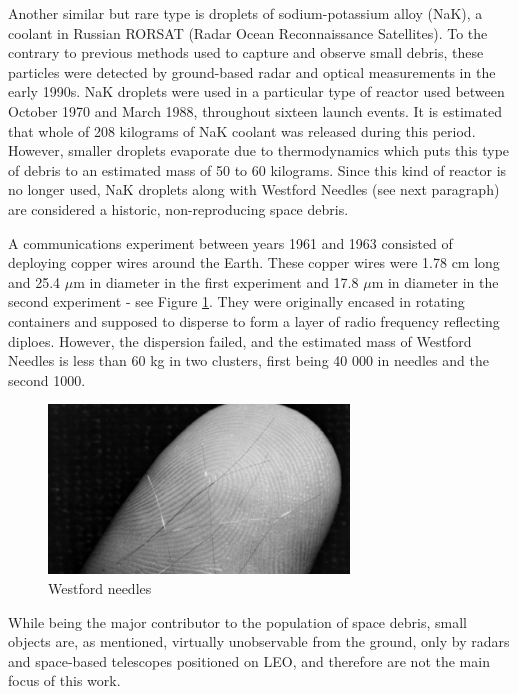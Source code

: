 	Another similar but rare type is droplets of sodium-potassium alloy (NaK), a coolant in Russian RORSAT (Radar Ocean Reconnaissance Satellites). To the contrary to previous methods used to capture and observe small debris, these particles were detected by ground-based radar and optical measurements in the early 1990s. NaK droplets were used in a particular type of reactor used between October 1970 and March 1988, throughout sixteen launch events. It is estimated that whole of 208 kilograms of NaK coolant was released during this period. However, smaller droplets evaporate due to thermodynamics which puts this type of debris to an estimated mass of 50 to 60 kilograms. Since this kind of reactor is no longer used, NaK droplets along with Westford Needles (see next paragraph) are considered a historic, non-reproducing space debris. 
	
	A communications experiment between years 1961 and 1963 consisted of deploying copper wires around the Earth. These copper wires were 1.78 cm long and 25.4 $\mu$m in diameter in the first experiment and 17.8 $\mu$m in diameter in the second experiment - see Figure \ref{fig:westfordneedles}. They were originally encased in rotating containers and supposed to disperse to form a layer of radio frequency reflecting diploes. However, the dispersion failed, and the estimated mass of Westford Needles is less than 60 kg in two clusters, first being 40 000 in needles and the second 1000.
	
\begin{figure}[H]
\centering
  \includegraphics[width=8cm]{images/westfordneedles}
  \caption{Westford needles}
  \label{fig:westfordneedles}
\end{figure}	
	
	While being the major contributor to the population of space debris, small objects are, as mentioned, virtually unobservable from the ground, only by radars and space-based telescopes positioned on LEO, and therefore are not the main focus of this work.

